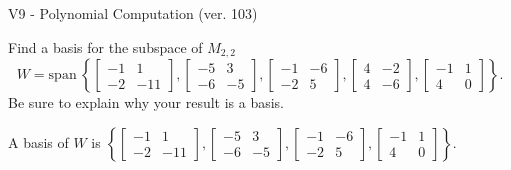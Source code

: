 \begin{exercise}
  \begin{exerciseTitle}V9 - Polynomial Computation (ver. 103)\end{exerciseTitle}
  \begin{exerciseStatement}
    Find a basis for the subspace of \(M_{2,2}\) 
\[W=\mathrm{span}\ \left\{\left[\begin{array}{cc}
-1 & 1 \\
-2 & -11
\end{array}\right] , \left[\begin{array}{cc}
-5 & 3 \\
-6 & -5
\end{array}\right] , \left[\begin{array}{cc}
-1 & -6 \\
-2 & 5
\end{array}\right] , \left[\begin{array}{cc}
4 & -2 \\
4 & -6
\end{array}\right] , \left[\begin{array}{cc}
-1 & 1 \\
4 & 0
\end{array}\right]\right\}.\]
 Be sure to explain why your result is a basis.


  \end{exerciseStatement}
  \begin{exerciseAnswer}
   A basis of \(W\) is  \(\left\{\left[\begin{array}{cc}
-1 & 1 \\
-2 & -11
\end{array}\right] , \left[\begin{array}{cc}
-5 & 3 \\
-6 & -5
\end{array}\right] , \left[\begin{array}{cc}
-1 & -6 \\
-2 & 5
\end{array}\right] , \left[\begin{array}{cc}
-1 & 1 \\
4 & 0
\end{array}\right]\right\}\).
  


  \end{exerciseAnswer}
\end{exercise}